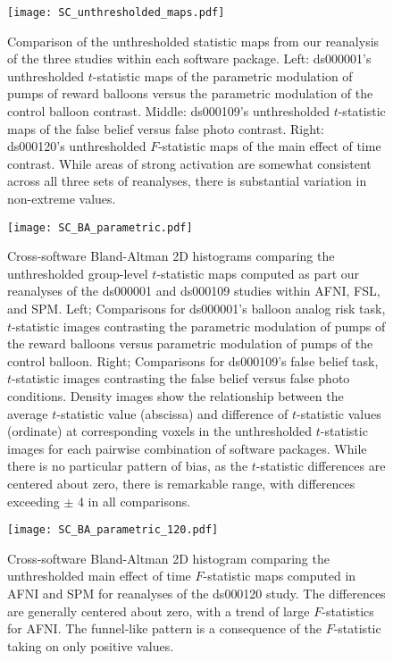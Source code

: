 \begin{figure}[htbp]
\centering
	\texttt{[image: SC\_unthresholded\_maps.pdf]}	
\caption{Comparison of the unthresholded statistic maps from our reanalysis of the three studies within each software package. Left: ds000001's unthresholded $t$-statistic maps of the parametric modulation of pumps of reward balloons versus the parametric modulation of the control balloon contrast. Middle: ds000109's unthresholded $t$-statistic maps of the false belief versus false photo contrast. Right: ds000120's unthresholded $F$-statistic maps of the main effect of time contrast. While areas of strong activation are somewhat consistent across all three sets of reanalyses, there is substantial variation in non-extreme values.}
\label{fig:SC_unthresholded_maps}
\end{figure}

\begin{figure}[htbp]
\centering
	\texttt{[image: SC\_BA\_parametric.pdf]}	
\caption{Cross-software Bland-Altman 2D histograms comparing the unthresholded group-level $t$-statistic maps computed as part our reanalyses of the ds000001 and ds000109 studies within AFNI, FSL, and SPM. Left; Comparisons for ds000001's balloon analog risk task, $t$-statistic images contrasting the parametric modulation of pumps of the reward balloons versus parametric modulation of pumps of the control balloon. Right; Comparisons for ds000109's false belief task, $t$-statistic images contrasting the false belief versus false photo conditions. Density images show the relationship between the average $t$-statistic value (abscissa) and difference of $t$-statistic values (ordinate) at corresponding voxels in the unthresholded $t$-statistic images for each pairwise combination of software packages. While there is no particular pattern of bias, as the $t$-statistic differences are centered about zero, there is remarkable range, with differences exceeding $\pm$ 4 in all comparisons.}
\label{fig:BA_parametric}
\end{figure}

\begin{figure}[htbp]
\centering
	\texttt{[image: SC\_BA\_parametric\_120.pdf]}	
\caption{Cross-software Bland-Altman 2D histogram comparing the unthresholded main effect of time $F$-statistic maps computed in AFNI and SPM for reanalyses of the ds000120 study. The differences are generally centered about zero, with a trend of large $F$-statistics for AFNI. The funnel-like pattern is a consequence of the $F$-statistic taking on only positive values.}
\label{fig:BA_parametric_120}
\end{figure}

